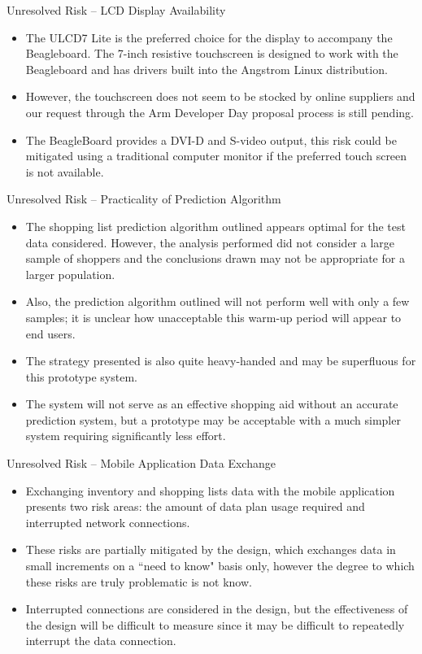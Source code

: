 \documentclass[t]{beamer}
\begin{document}
\begin{frame}{Unresolved Risk -- LCD Display Availability}
\begin{itemize}
\item The ULCD7 Lite is the preferred choice for the display to accompany the Beagleboard. The 7-inch resistive touchscreen is designed to work with the Beagleboard and has drivers built into the Angstrom Linux distribution.
\item However, the touchscreen does not seem to be stocked by online suppliers and our request through the Arm Developer Day proposal process is still pending.
\item The BeagleBoard provides a DVI-D and S-video output, this risk could be mitigated using a traditional computer monitor if the preferred touch screen is not available.
\end{itemize}
\end{frame}

\begin{frame}{Unresolved Risk -- Practicality of Prediction Algorithm}
\begin{itemize}
\item The shopping list prediction algorithm outlined appears optimal for the test data considered. However, the analysis performed did not consider a large sample of shoppers and the conclusions drawn may not be appropriate for a larger population.
\item Also, the prediction algorithm outlined will not perform well with only a few samples; it is unclear how unacceptable this warm-up period will appear to end users.
\item The strategy presented is also quite heavy-handed and may be superfluous for this prototype system. 
\item The system will not serve as an effective shopping aid without an accurate prediction system, but a prototype may be acceptable with a much simpler system requiring significantly less effort.
\end{itemize}
\end{frame}

\begin{frame}{Unresolved Risk -- Mobile Application Data Exchange}
\begin{itemize}
\item Exchanging inventory and shopping lists data with the mobile application presents two risk areas: the amount of data plan usage required and interrupted network connections.
\item These risks are partially mitigated by the design, which exchanges data in small increments on a ``need to know" basis only, however the degree to which these risks are truly problematic is not know.
\item Interrupted connections are considered in the design, but the effectiveness of the design will be difficult to measure since it may be difficult to repeatedly interrupt the data connection.
\end{itemize}
\end{frame}
\end{document}
